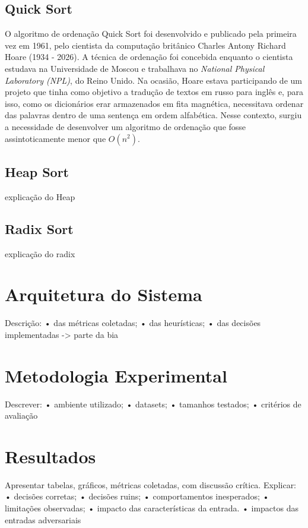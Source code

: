 \documentclass{article}
\begin{document}
    \subsection{Quick Sort}
        O algoritmo de ordenação Quick Sort foi desenvolvido e publicado pela primeira vez em 1961, pelo cientista da computação britânico Charles Antony Richard Hoare (1934 - 2026). A técnica de ordenação foi concebida enquanto o cientista estudava na Universidade de Moscou e trabalhava no \textit{National Physical Laboratory (NPL)}, do Reino Unido. Na ocasião, Hoare estava participando de um projeto que tinha como objetivo a tradução de textos em russo para inglês e, para isso, como os dicionários erar armazenados em fita magnética, necessitava ordenar das palavras dentro de uma sentença em ordem alfabética. Nesse contexto, surgiu a necessidade de desenvolver um algoritmo de ordenação que fosse assintoticamente menor que $O(n^2)$.

    \subsection{Heap Sort}
    explicação do Heap


    \subsection{Radix Sort}
    explicação do radix

\newpage

\section{Arquitetura do Sistema}
Descrição:
• das métricas coletadas;
• das heurísticas;
• das decisões implementadas -> parte da bia

\newpage

\section{Metodologia Experimental}
Descrever:
• ambiente utilizado;
• datasets;
• tamanhos testados;
• critérios de avaliação

\newpage

\section{Resultados}
Apresentar tabelas, gráficos, métricas coletadas, com discussão crítica. Explicar:
• decisões corretas;
• decisões ruins;
• comportamentos inesperados;
• limitações observadas;
• impacto das características da entrada.
• impactos das entradas adversariais
\end{document}
